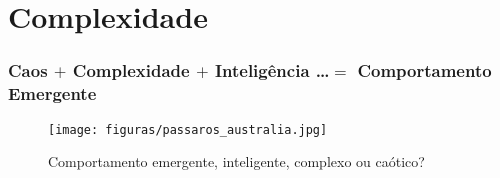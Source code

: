 \documentclass{beamer}
\begin{document}
\begin{comment}
\section{Para efeitos de TEMPLATE}
\begin{frame}
\frametitle{Nome do SLIDE}
\begin{block}{Nome do Bloco}
  \begin{itemize}
   \item T1

    \item<2-> T2

    \item<3-> T3

  \item<4-> 

    \item<5-> 
    
        \item<6-> 
    \end{itemize}
  
\end{block}

\end{frame}
\end{comment}

\section{Complexidade}
\begin{frame}

\frametitle{Caos $ + $ Complexidade $ + $ Inteligência \ldots $=$ Comportamento Emergente}

\begin{figure}[ht!]
 \centering
 \texttt{[image: figuras/passaros\_australia.jpg]}

\caption{Comportamento emergente, inteligente, complexo ou caótico?} 

\end{figure}


\end{frame}
\end{document}
